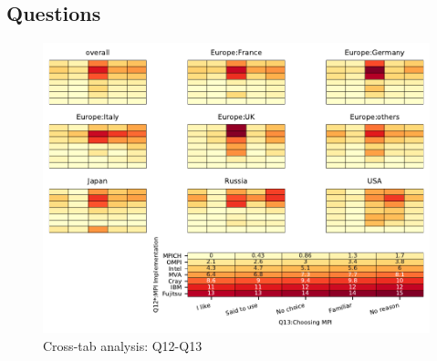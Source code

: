 
\subsection{Questions}


\begin{figure}
\begin{center}
\includegraphics[width=12cm]{../pdfs/Q12-Q13.pdf}
\caption{Cross-tab analysis: Q12-Q13}
\label{fig:Q12-Q13}
\end{center}
\end{figure}
